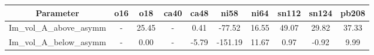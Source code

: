 \begin{tabular}{|c||c||c||c||c||c||c||c||c||c|} 
 \hline 
\bf{Parameter}& \bf{o16}& \bf{o18}& \bf{ca40}& \bf{ca48}& \bf{ni58}& \bf{ni64}& \bf{sn112}& \bf{sn124}& \bf{pb208}\\
 \hline
 \hline 
Im\_vol\_A\_above\_asymm & - & 25.45 & - & 0.41 & -77.52 & 16.55 & 49.07 & 29.82 & 37.33\\
Im\_vol\_A\_below\_asymm & - & 0.00 & - & -5.79 & -151.19 & 11.67 & 0.97 & -0.92 & 9.99\\

 \hline 
\end{tabular}